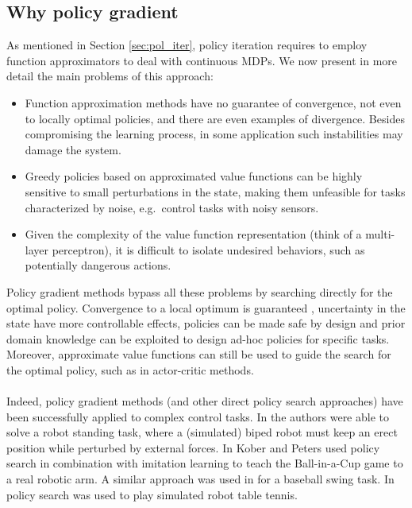 \subsection{Why policy gradient}\label{sec:why_pg}
As mentioned in Section \ref{sec:pol_iter}, policy iteration requires to employ function approximators to deal with continuous \ac{MDP}s. We now present in more detail the main problems of this approach:
\begin{itemize}
\item Function approximation methods have no guarantee of convergence, not even to locally optimal policies, and there are even examples of divergence. Besides compromising the learning process, in some application such instabilities may damage the system. 
\item Greedy policies based on approximated value functions can be highly sensitive to small perturbations in the state, making them unfeasible for tasks characterized by noise, e.g.\ control tasks with noisy sensors.
\item Given the complexity of the value function representation (think of a multi-layer perceptron), it is difficult to isolate undesired behaviors, such as potentially dangerous actions.
\end{itemize}
Policy gradient methods bypass all these problems by searching directly for the optimal policy. Convergence to a local optimum is guaranteed \cite{More:1994:LSA:192115.192132}, uncertainty in the state have more controllable effects, policies can be made safe by design and prior domain knowledge can be exploited to design ad-hoc policies for specific tasks. Moreover, approximate value functions can still be used to guide the search for the optimal policy, such as in actor-critic methods.

\paragraph{} %
Indeed, policy gradient methods (and other direct policy search approaches) have been successfully applied to complex control tasks. In \cite{Sehnke2008policy} the authors were able to solve a robot standing task, where a (simulated) biped robot must keep an erect position while perturbed by external forces. In \cite{kober_NIPS2008} Kober and Peters used policy search in combination with imitation learning to teach the Ball-in-a-Cup game to a real robotic arm. A similar approach was used in \cite{Peters2008natural} for a baseball swing task. In \cite{peters2010relative} policy search was used to play simulated robot table tennis. 

